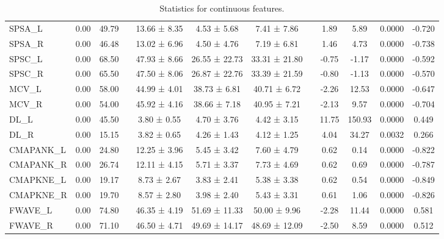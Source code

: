 \documentclass[pdflatex,sn-vancouver-num]{sn-jnl}
\begin{document}
\begin{table}[t]
\begin{tabular}{lccccccccccc}
SPSA\_L & 0.00 & 49.79 &  & 13.66 ± 8.35 & 4.53 ± 5.68 & 7.41 ± 7.86 &  & 1.89 & 5.89 & 0.0000 & -0.720 \\
SPSA\_R & 0.00 & 46.48 &  & 13.02 ± 6.96 & 4.50 ± 4.76 & 7.19 ± 6.81 &  & 1.46 & 4.73 & 0.0000 & -0.738 \\
SPSC\_L & 0.00 & 68.50 &  & 47.93 ± 8.66 & 26.55 ± 22.73 & 33.31 ± 21.80 &  & -0.75 & -1.17 & 0.0000 & -0.592 \\
SPSC\_R & 0.00 & 65.50 &  & 47.50 ± 8.06 & 26.87 ± 22.76 & 33.39 ± 21.59 &  & -0.80 & -1.13 & 0.0000 & -0.570 \\
MCV\_L & 0.00 & 58.00 &  & 44.99 ± 4.01 & 38.73 ± 6.81 & 40.71 ± 6.72 &  & -2.26 & 12.53 & 0.0000 & -0.647 \\
MCV\_R & 0.00 & 54.00 &  & 45.92 ± 4.16 & 38.66 ± 7.18 & 40.95 ± 7.21 &  & -2.13 & 9.57 & 0.0000 & -0.704 \\
DL\_L & 0.00 & 45.50 &  & 3.80 ± 0.55 & 4.70 ± 3.76 & 4.42 ± 3.15 &  & 11.75 & 150.93 & 0.0000 & 0.449 \\
DL\_R & 0.00 & 15.15 &  & 3.82 ± 0.65 & 4.26 ± 1.43 & 4.12 ± 1.25 &  & 4.04 & 34.27 & 0.0032 & 0.266 \\
CMAPANK\_L & 0.00 & 24.80 &  & 12.25 ± 3.96 & 5.45 ± 3.42 & 7.60 ± 4.79 &  & 0.62 & 0.14 & 0.0000 & -0.822 \\
CMAPANK\_R & 0.00 & 26.74 &  & 12.11 ± 4.15 & 5.71 ± 3.37 & 7.73 ± 4.69 &  & 0.62 & 0.69 & 0.0000 & -0.787 \\
CMAPKNE\_L & 0.00 & 19.17 &  & 8.73 ± 2.67 & 3.83 ± 2.41 & 5.38 ± 3.38 &  & 0.62 & 0.54 & 0.0000 & -0.849 \\
CMAPKNE\_R & 0.00 & 19.70 &  & 8.57 ± 2.80 & 3.98 ± 2.40 & 5.43 ± 3.31 &  & 0.61 & 1.06 & 0.0000 & -0.826 \\
FWAVE\_L & 0.00 & 74.80 &  & 46.35 ± 4.19 & 51.69 ± 11.33 & 50.00 ± 9.96 &  & -2.28 & 11.44 & 0.0000 & 0.581 \\
FWAVE\_R & 0.00 & 71.10 &  & 46.50 ± 4.71 & 49.69 ± 14.17 & 48.69 ± 12.09 &  & -2.50 & 8.59 & 0.0000 & 0.512 \\
\bottomrule
\end{tabular}
\caption{Statistics for continuous features.}
\label{tab:continuous}
\end{table}
\end{document}
